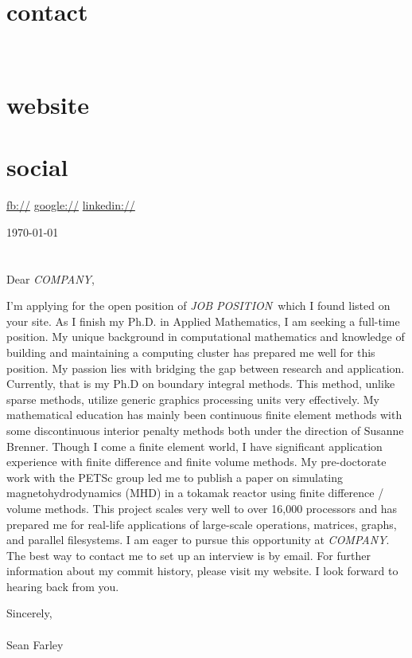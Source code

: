 \documentclass[]{fancy-cv}
\newcommand\company{\emph{COMPANY}}
\newcommand\position{\emph{JOB POSITION}}
\begin{document}

\begin{aside}
  \section{contact}
    \href{mailto:\myemail}{\myemail}
    ~
    \myphone
    ~
    \myaddress
    \mycity
  \section{website}
    \href{\mywebsite}{\mywebsite}
  \section{social}
    \href{http://facebook.com/\myfb}{fb://\myfb}
    \href{http://plug.google.com/\mygp}{google://\mygp}
    \href{http://www.linkedin.com/in/\mylinkedin}{linkedin://\mylinkedin}
\end{aside}

\vspace{.8em}
\large
\today\\
\\
\\
Dear \company,

I'm applying for the open position of \position~which I found listed on your
site. As I finish my Ph.D. in Applied Mathematics, I am seeking a full-time
position. My unique background in computational mathematics and knowledge of
building and maintaining a computing cluster has prepared me well for this
position.
%
\newline\newline
%
My passion lies with bridging the gap between research and application.
Currently, that is my Ph.D on boundary integral methods. This method, unlike
sparse methods, utilize generic graphics processing units very effectively. My
mathematical education has mainly been continuous finite element methods with
some discontinuous interior penalty methods both under the direction of Susanne
Brenner. Though I come a finite element world, I have significant application
experience with finite difference and finite volume methods.
%
\newline\newline
%
My pre-doctorate work with the PETSc group led me to publish a paper on
simulating magnetohydrodynamics (MHD) in a tokamak reactor using finite
difference / volume methods. This project scales very well to over 16,000
processors and has prepared me for real-life applications of large-scale
operations, matrices, graphs, and parallel filesystems.
%
\newline\newline
%
I am eager to pursue this opportunity at \company. The best way to contact me
to set up an interview is by email. For further information about my commit
history, please visit my website. I look forward to hearing back from you.

\vspace{2em}
Sincerely,\\
\\
Sean Farley
\end{document}

